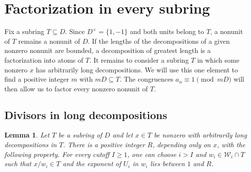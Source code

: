 \documentclass{article}
\newtheorem{lemma}[proposition]{Lemma}
\theoremstyle{remark}
\begin{document}
\section{Factorization in every subring}

Fix a subring $T \subseteq D$.
Since $D^\times = \{1, -1\}$ and both units belong to $T$, a nonunit of $T$ remains a nonunit of $D$.
If the lengths of the decompositions of a given nonzero nonunit are bounded, a decomposition of greatest length is a factorization into atoms of $T$.
It remains to consider a subring $T$ in which some nonzero $x$ has arbitrarily long decompositions.
We will use this one element to find a positive integer $m$ with $mD \subseteq T$.
The congruences $a_n \equiv 1 \pmod{mD}$ will then allow us to factor every nonzero nonunit of $T$.

\subsection{Divisors in long decompositions}

\begin{lemma}
    \label{lem:subring-divisors}
    Let $T$ be a subring of $D$ and let $x \in T$ be nonzero with arbitrarily long decompositions in $T$.
    There is a positive integer $R$, depending only on $x$, with the following property.
    For every cutoff $I \ge 1$, one can choose $i > I$ and $w_i \in \mathcal{W}_i \cap T$ such that $x/w_i \in T$ and the exponent of $U_i$ in $w_i$ lies between $1$ and $R$.
\end{lemma}
\end{document}
